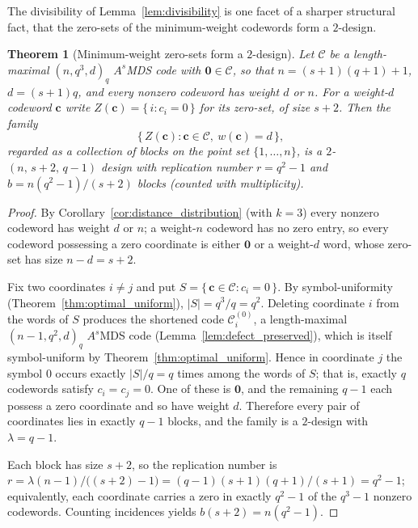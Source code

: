\documentclass[12pt, letterpaper]{article}
\theoremstyle{plain}
\newtheorem{theorem}{Theorem}[section]
\theoremstyle{definition}
\begin{document}
	The divisibility of Lemma~\ref{lem:divisibility} is one facet of a sharper structural fact, that the zero-sets of the minimum-weight codewords form a $2$-design.

	\begin{theorem}[Minimum-weight zero-sets form a $2$-design]
		\label{thm:zero_set_design}
		Let $\mathcal{C}$ be a length-maximal $(n, q^3, d)_q$ $A^s$MDS code with $\mathbf{0} \in \mathcal{C}$, so that $n = (s+1)(q+1)+1$, $d = (s+1)q$, and every nonzero codeword has weight $d$ or $n$. For a weight-$d$ codeword $\mathbf{c}$ write $Z(\mathbf{c}) = \{\, i : c_i = 0 \,\}$ for its zero-set, of size $s+2$. Then the family
		\[
			\bigl\{\, Z(\mathbf{c}) : \mathbf{c} \in \mathcal{C},\ w(\mathbf{c}) = d \,\bigr\},
		\]
		regarded as a collection of blocks on the point set $\{1, \dots, n\}$, is a $2$-$(n,\, s+2,\, q-1)$ design with replication number $r = q^2 - 1$ and $b = n(q^2-1)/(s+2)$ blocks (counted with multiplicity).
	\end{theorem}

	\begin{proof}
		By Corollary~\ref{cor:distance_distribution} (with $k=3$) every nonzero codeword has weight $d$ or $n$; a weight-$n$ codeword has no zero entry, so every codeword possessing a zero coordinate is either $\mathbf{0}$ or a weight-$d$ word, whose zero-set has size $n-d = s+2$.

		Fix two coordinates $i \ne j$ and put $S = \{\, \mathbf{c} \in \mathcal{C} : c_i = 0 \,\}$. By symbol-uniformity (Theorem~\ref{thm:optimal_uniform}), $|S| = q^3/q = q^2$. Deleting coordinate $i$ from the words of $S$ produces the shortened code $\mathcal{C}_i^{(0)}$, a length-maximal $(n-1, q^2, d)_q$ $A^s$MDS code (Lemma~\ref{lem:defect_preserved}), which is itself symbol-uniform by Theorem~\ref{thm:optimal_uniform}. Hence in coordinate $j$ the symbol $0$ occurs exactly $|S|/q = q$ times among the words of $S$; that is, exactly $q$ codewords satisfy $c_i = c_j = 0$. One of these is $\mathbf{0}$, and the remaining $q-1$ each possess a zero coordinate and so have weight $d$. Therefore every pair of coordinates lies in exactly $q-1$ blocks, and the family is a $2$-design with $\lambda = q-1$.

		Each block has size $s+2$, so the replication number is $r = \lambda(n-1)/\bigl((s+2)-1\bigr) = (q-1)(s+1)(q+1)/(s+1) = q^2-1$; equivalently, each coordinate carries a zero in exactly $q^2-1$ of the $q^3-1$ nonzero codewords. Counting incidences yields $b(s+2) = n(q^2-1)$.
	\end{proof}
\end{document}
